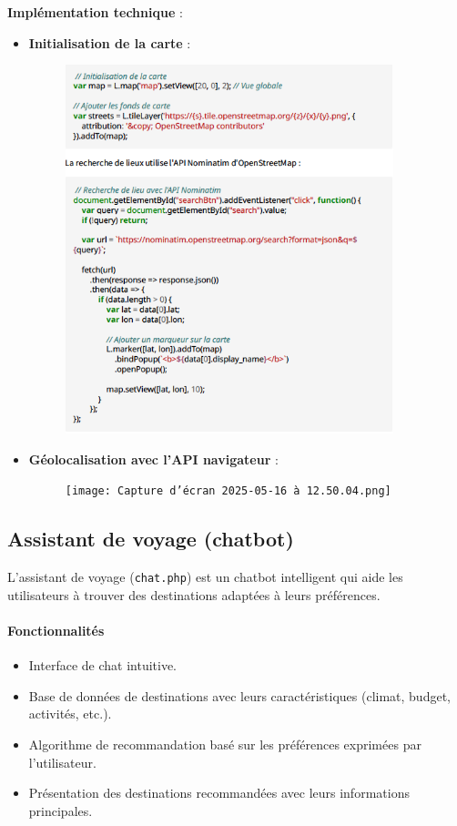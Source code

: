 \documentclass[a4paper,12pt]{article}
\begin{document}
\textbf{Implémentation technique} :
\begin{itemize}
  \item \textbf{Initialisation de la carte} :
  \begin{figure}[H]
  \centering
  \includegraphics[width=0.9\textwidth]{1.png}
  
\end{figure}

  \item \textbf{Géolocalisation avec l'API navigateur} :
  \begin{figure}[H]
  \centering
  \texttt{[image: Capture d’écran 2025-05-16 à 12.50.04.png]}
 
\end{figure}
\end{itemize}

\subsection{Assistant de voyage (chatbot)}

L'assistant de voyage (\texttt{chat.php}) est un chatbot intelligent qui aide les utilisateurs à trouver des destinations adaptées à leurs préférences.

\paragraph{Fonctionnalités}
\begin{itemize}
  \item Interface de chat intuitive.
  \item Base de données de destinations avec leurs caractéristiques (climat, budget, activités, etc.).
  \item Algorithme de recommandation basé sur les préférences exprimées par l'utilisateur.
  \item Présentation des destinations recommandées avec leurs informations principales.
\end{itemize}
\end{document}

